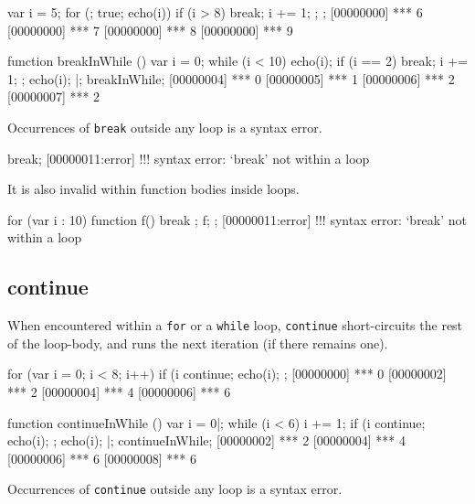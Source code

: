 \begin{urbiscript}
{
  var i = 5;
  for (; true; echo(i))
  {
    if (i > 8)
      break;
    i += 1;
  };
};
[00000000] *** 6
[00000000] *** 7
[00000000] *** 8
[00000000] *** 9
\end{urbiscript}

\begin{urbiscript}
function breakInWhile ()
{
  var i = 0;
  while (i < 10)
  {
    echo(i);
    if (i == 2)
      break;
    i += 1;
  };
  echo(i);
}|;
breakInWhile;
[00000004] *** 0
[00000005] *** 1
[00000006] *** 2
[00000007] *** 2
\end{urbiscript}

Occurrences of \lstinline|break| outside any loop is a syntax error.

\begin{urbiscript}
break;
[00000011:error] !!! syntax error: `break' not within a loop
\end{urbiscript}

It is also invalid within function bodies inside loops.

\begin{urbiscript}
for (var i : 10)
{
  function f() { break };
  f;
};
[00000011:error] !!! syntax error: `break' not within a loop
\end{urbiscript}


\subsection{continue}
\label{sec:lang:continue}

When encountered within a \lstinline|for| or a \lstinline|while| loop,
\lstinline|continue| short-circuits the rest of the loop-body, and
runs the next iteration (if there remains one).

\begin{urbiscript}
for (var i = 0; i < 8; i++)
{
  if (i %
    continue;
  echo(i);
};
[00000000] *** 0
[00000002] *** 2
[00000004] *** 4
[00000006] *** 6
\end{urbiscript}

\begin{urbiscript}
function continueInWhile ()
{
  var i = 0|;
  while (i < 6)
  {
    i += 1;
    if (i %
      continue;
    echo(i);
  };
  echo(i);
}|;
continueInWhile;
[00000002] *** 2
[00000004] *** 4
[00000006] *** 6
[00000008] *** 6
\end{urbiscript}

Occurrences of \lstinline|continue| outside any loop is a syntax error.


